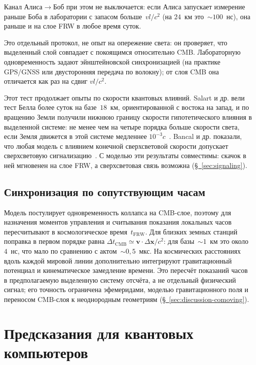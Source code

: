 \documentclass[11pt,a4paper]{article}
\begin{document}
Канал Алиса$\to$Боб при этом не выключается: если Алиса запускает измерение раньше Боба в лаборатории с запасом больше~$vl/c^2$ (на $24$~км это~$\sim100$~нс), она раньше и на слое FRW в любое время суток.

Это отдельный протокол, не опыт на опережение света: он проверяет, что выделенный слой совпадает с покоящимся относительно CMB. Лабораторную одновременность задают эйнштейновской синхронизацией (на практике GPS/GNSS или двусторонняя передача по волокну); от слоя CMB она отличается как раз на сдвиг $vl/c^2$.

Этот тест продолжает опыты по скорости квантовых влияний. Salart и др. вели тест Белла более суток на базе~$18$~км, ориентированной с востока на запад, и по вращению Земли получили нижнюю границу скорости гипотетического влияния в выделенной системе: не менее чем на четыре порядка больше скорости света, если Земля движется в этой системе медленнее $10^{-3}c$~\cite{salart2008}. Bancal и др. показали, что любая модель с влиянием конечной сверхсветовой скорости допускает сверхсветовую сигнализацию~\cite{bancal2012}. С моделью эти результаты совместимы: скачок в ней мгновенен на слое FRW, а сверхсветовая связь возможна (\hyperref[sec:signaling]{\S~\ref*{sec:signaling}}).

\subsection{Синхронизация по сопутствующим часам}

Модель постулирует одновременность коллапса на CMB-слое, поэтому для назначения моментов управления и считывания показания локальных часов пересчитывают в космологическое время~$t_{\mathrm{FRW}}$. Для близких земных станций поправка в первом порядке равна $\Delta t_{\mathrm{CMB}}\simeq\mathbf{v}\!\cdot\!\Delta\mathbf{x}/c^2$: для базы~$\sim1$~км это около~$4$~нс, что мало по сравнению с актом~$\sim0{,}5$~мкс. На космических расстояниях вдоль каждой мировой линии дополнительно интегрируют гравитационный потенциал и кинематическое замедление времени. Это пересчёт показаний часов в предполагаемую выделенную систему отсчёта, а не отдельный физический сигнал; его точность ограничена эфемеридами, моделью гравитационного поля и переносом CMB-слоя к неоднородным геометриям (\hyperref[sec:discussion-comoving]{\S~\ref*{sec:discussion-comoving}}).

\section{Предсказания для квантовых компьютеров}
\label{sec:ft}
\end{document}
